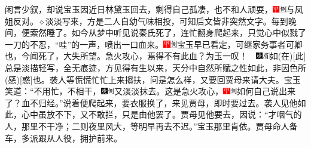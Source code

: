 闲言少叙，却说宝玉因近日林黛玉回去，剩得自己孤凄，也不和人顽耍，{\includegraphics[width=3mm]{../Images/00002}\includegraphics[width=3mm]{../Images/00011}\footnotesize \kaishu 与凤姐反对。{$\diamond$}淡淡写来，方是二人自幼气味相投，可知后文皆非突然文字。}每到晚间，便索然睡了。如今从梦中听见说秦氏死了，连忙翻身爬起来，只觉心中似戮了一刀的不忍，“哇”的一声，喷出一口血来。{{\includegraphics[width=3mm]{../Images/00002}\includegraphics[width=3mm]{../Images/00011}\footnotesize \kaishu 宝玉早已看定，可继家务事者可卿也，今闻死了，大失所望。急火攻心，焉得不有此血？为玉一叹！　\includegraphics[width=3mm]{../Images/00004}\includegraphics[width=3mm]{../Images/00010}\footnotesize \kaishu 如{(在)}{[}此{]}总是淡描轻写，全无痕迹，方见得有生以来，天分中自然所赋之性如此，非因色所{(感)}{[}惑{]}也。}}袭人等慌慌忙忙上来搊扶，问是怎么样，又要回贾母来请大夫。宝玉笑道：“不用忙，不相干，{\includegraphics[width=3mm]{../Images/00004}\includegraphics[width=3mm]{../Images/00011}\footnotesize \kaishu 又淡淡抹去。}这是急火攻心，{\includegraphics[width=3mm]{../Images/00002}\includegraphics[width=3mm]{../Images/00011}\footnotesize \kaishu 如何自己说出来了？}血不归经。”说着便爬起来，要衣服换了，来见贾母，即时要过去。袭人见他如此，心中虽放不下，又不敢拦，只是由他罢了。贾母见他要去，因说：“才咽气的人，那里不干净；二则夜里风大，等明早再去不迟。”宝玉那里肯依。贾母命人备车，多派跟从人役，拥护前来。

